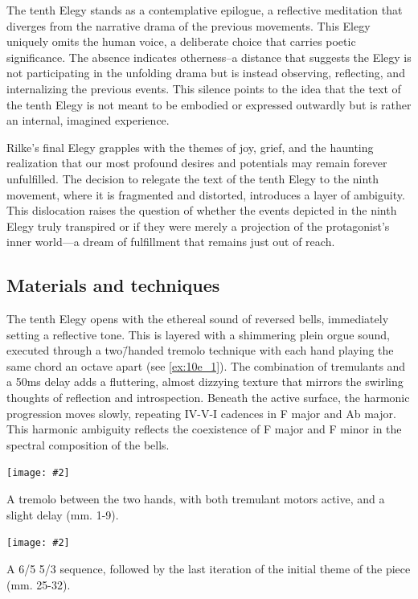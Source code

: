 \documentclass[12pt,twoside,maitrise]{dms_ks}
\newcommand{\customincludeexamples}[4][]{%
    \begin{example}[H]
        \centering
        \texttt{[image: \#2]}
        \caption{#4}
	\label{#3} 
    \end{example}
}
\theoremstyle{definition}
\begin{document}
{{The tenth Elegy stands as a contemplative epilogue, a reflective meditation that diverges from the narrative drama of the previous movements. 
This Elegy uniquely omits the human voice, a deliberate choice that carries poetic significance. 
The absence indicates otherness--a distance that suggests the Elegy is not participating in the unfolding drama but is instead observing, reflecting, and internalizing the previous events. 
This silence points to the idea that the text of the tenth Elegy is not meant to be embodied or expressed outwardly but is rather an internal, imagined experience.

Rilke’s final Elegy grapples with the themes of joy, grief, and the haunting realization that our most profound desires and potentials may remain forever unfulfilled. 
The decision to relegate the text of the tenth Elegy to the ninth movement, where it is fragmented and distorted, introduces a layer of ambiguity. 
This dislocation raises the question of whether the events depicted in the ninth Elegy truly transpired or if they were merely a projection of the protagonist's inner world—a dream of fulfillment that remains just out of reach.

\subsection{Materials and techniques}

The tenth Elegy opens with the ethereal sound of reversed bells, immediately setting a reflective tone. 
This is layered with a shimmering plein orgue sound, executed through a two\=/handed tremolo technique with each hand playing the same chord an octave apart (see \cref{ex:10e_1}). 
The combination of tremulants and a 50ms delay adds a fluttering, almost dizzying texture that mirrors the swirling thoughts of reflection and introspection. 
Beneath the active surface, the harmonic progression moves slowly, repeating IV-V-I cadences in F major and Ab major. 
This harmonic ambiguity reflects the coexistence of F major and F minor in the spectral composition of the bells.

\customincludeexamples[width=\textwidth]{10e_1}{ex:10e_1}{A tremolo between the two hands, with both tremulant motors active, and a slight delay (mm. 1-9).}

\customincludeexamples[width=\textwidth]{10e_2}{ex:10e_2}{A 6/5 5/3 sequence, followed by the last iteration of the initial theme of the piece (mm. 25-32).}

}}
\end{document}
